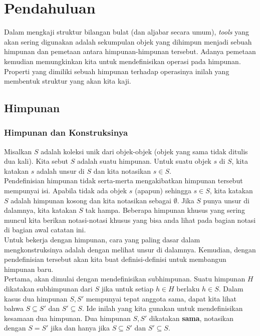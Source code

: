 
	\chapter{Pendahuluan}
	Dalam mengkaji struktur bilangan bulat (dan aljabar secara umum), \textit{tools} yang akan sering digunakan adalah sekumpulan objek yang dihimpun menjadi sebuah himpunan dan pemetaan antara himpunan-himpunan tersebut. Adanya pemetaan kemudian memungkinkan kita untuk mendefinisikan operasi pada himpunan. Properti yang dimiliki sebuah himpunan terhadap operasinya inilah yang membentuk struktur yang akan kita kaji.
	\section{Himpunan}
	\subsection{Himpunan dan Konstruksinya}
	Misalkan $S$ adalah koleksi unik dari objek-objek (objek yang sama tidak ditulis dua kali). Kita sebut $S$ adalah suatu himpunan. Untuk suatu objek $s$ di $S$, kita katakan $s$ adalah unsur di $S$ dan kita notasikan $s \in S$.
	\\
	
	Pendefinisian himpunan tidak serta-merta mengakibatkan himpunan tersebut mempunyai isi. Apabila tidak ada objek $s$ (apapun) sehingga $s \in S$, kita katakan $S$ adalah himpunan kosong dan kita notasikan sebagai $\emptyset$. Jika $S$ punya unsur di dalamnya, kita katakan $S$ tak hampa. Beberapa himpunan khusus yang sering muncul kita berikan notasi-notasi khusus yang bisa anda lihat pada bagian notasi di bagian awal catatan ini.
	\\
	
	Untuk bekerja dengan himpunan, cara yang paling dasar dalam mengkonstruksinya adalah dengan melihat unsur di dalamnya. Kemudian, dengan pendefinisian tersebut akan kita buat definisi-definisi untuk membangun himpunan baru.
	\\
	
	Pertama, akan dimulai dengan mendefinisikan subhimpunan. Suatu himpunan $H$ dikatakan subhimpunan dari $S$ jika untuk setiap $h \in H$ berlaku $h \in S$. Dalam kasus dua himpunan $S, S'$ mempunyai tepat anggota sama, dapat kita lihat bahwa $S \subseteq S'$ dan $S' \subseteq S$. Ide inilah yang kita gunakan untuk mendefinisikan kesamaan dua himpunan. Dua himpunan $S, S'$ dikatakan \textbf{sama}, notasikan dengan $S = S'$ jika dan hanya jika $S \subseteq S'$ dan $S' \subseteq S$.
	\\
	
